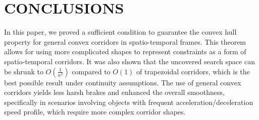 \section{CONCLUSIONS} \label{CONCLUSIONS}
In this paper, we proved a sufficient condition to guarantee the convex hull property for general convex corridors in spatio-temporal frames. This theorem allows for using more complicated shapes to represent constraints as a form of spatio-temporal corridors. It was also shown that the uncovered search space can be shrunk to $O(\frac{1}{n^2})$ compared to $O(1)$ of trapezoidal corridors, which is the best possible result under continuity assumptions.
The use of general convex corridors yields less harsh brakes and enhanced the overall smoothness, specifically in scenarios involving objects with frequent acceleration/deceleration speed profile, which require more complex corridor shapes.